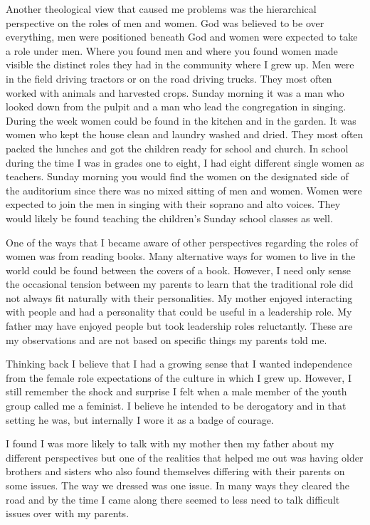 Another theological view that caused me problems was the hierarchical perspective on the roles of men and women.
God was believed to be over everything, men were positioned beneath God and women were expected to take a role under men.
Where you found men and where you found women made visible the distinct roles they had in the community where I grew up.
Men were in the field driving tractors or on the road driving trucks.
They most often worked with animals and harvested crops.
Sunday morning it was a man who looked down from the pulpit and a man who lead the congregation in singing.
During the week women could be found in the kitchen and in the garden.
It was women who kept the house clean and laundry washed and dried.
They most often packed the lunches and got the children ready for school and church.
In school during the time I was in grades one to eight, I had eight different single women as teachers.
Sunday morning you would find the women on the designated side of the auditorium since there was no mixed sitting of men and women.
Women were expected to join the men in singing with their soprano and alto voices.
They would likely be found teaching the children's Sunday school classes as well.

One of the ways that I became aware of other perspectives regarding the roles of women was from reading books.
Many alternative ways for women to live in the world could be found between the covers of a book.
However, I need only sense the occasional tension between my parents to learn that the traditional role did not always fit naturally with their personalities.
My mother enjoyed interacting with people and had a personality that could be useful in a leadership role.
My father may have enjoyed people but took leadership roles reluctantly.
These are my observations and are not based on specific things my parents told me.

Thinking back I believe that I had a growing sense that I wanted independence from the female role expectations of the culture in which I grew up.
However, I still remember the shock and surprise I felt when a male member of the youth group called me a feminist.
I believe he intended to be derogatory and in that setting he was, but internally I wore it as a badge of courage.

I found I was more likely to talk with my mother then my father about my different perspectives but one of the realities that helped me out was having older brothers and sisters who also found themselves differing with their parents on some issues.
The way we dressed was one issue.
In many ways they cleared the road and by the time I came along there seemed to less need to talk difficult issues over with my parents.

